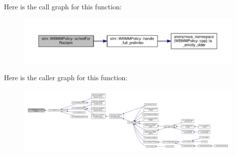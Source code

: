 Here is the call graph for this function\-:
\nopagebreak
\begin{figure}[H]
\begin{center}
\leavevmode
\includegraphics[width=350pt]{classstm_1_1WBMMPolicy_aa2aa233946e7b6b1d35b184503b8c9f9_cgraph}
\end{center}
\end{figure}




Here is the caller graph for this function\-:
\nopagebreak
\begin{figure}[H]
\begin{center}
\leavevmode
\includegraphics[width=350pt]{classstm_1_1WBMMPolicy_aa2aa233946e7b6b1d35b184503b8c9f9_icgraph}
\end{center}
\end{figure}


